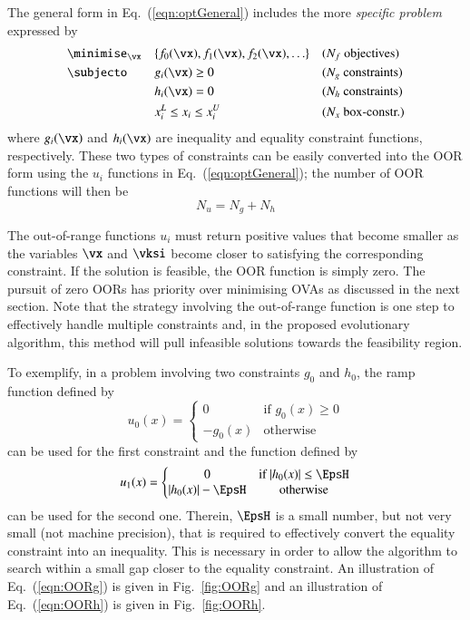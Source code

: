 \documentclass[final,5p,times,twocolumn]{elsarticle}
\newcommand{\figname} {Fig.}
\newcommand{\eqname}  {Eq.}
\begin{document}
The general form in \eqname~(\ref{eqn:optGeneral}) includes the more \emph{specific problem}
expressed by
\begin{equation}
\begin{aligned}
& \minimise_{\vx} && \{f_0(\vx), f_1(\vx), f_2(\vx), \ldots\} && \text{($N_f$ objectives)} \\
& \subjecto       && g_i(\vx) \geq 0                          && \text{($N_g$ constraints)} \\
&                 && h_i(\vx) = 0                             && \text{($N_h$ constraints)} \\
&                 && x_i^L \leq x_i \leq x_i^U                && \text{($N_x$ box-constr.)}
\end{aligned}
\label{eqn:optReal}
\end{equation}
where $g_i(\vx)$ and $h_i(\vx)$ are inequality and equality constraint functions, respectively.
These two types of constraints can be easily converted into the OOR form using the $u_i$ functions
in \eqname~(\ref{eqn:optGeneral}); the number of OOR functions will then be
\begin{equation}
    N_u = N_g + N_h
\end{equation}

The out-of-range functions $u_i$ must return positive values that become smaller as the variables
$\vx$ and $\vksi$ become closer to satisfying the corresponding constraint. If the solution is
feasible, the OOR function is simply zero. The pursuit of zero OORs has priority over minimising
OVAs as discussed in the next section. Note that the strategy involving the out-of-range function is
one step to effectively handle multiple constraints and, in the proposed evolutionary algorithm,
this method will pull infeasible solutions towards the feasibility region.

To exemplify, in a problem involving two constraints $g_0$ and $h_0$, the ramp function defined by
\begin{equation}
    u_0(x) = \left\{\begin{matrix}
        0       & \text{if $g_0(x) \geq 0$} \\
        -g_0(x) & \text{otherwise}
    \end{matrix}\right.
\label{eqn:OORg}
\end{equation}
can be used for the first constraint and the function defined by
\begin{equation}
    u_1(x) = \left\{\begin{matrix}
        0              & \text{if $|h_0(x)| \leq \EpsH$} \\
        |h_0(x)|-\EpsH & \text{otherwise}
    \end{matrix}\right.
\label{eqn:OORh}
\end{equation}
can be used for the second one. Therein, $\EpsH$ is a small number, but not very small (not machine
precision), that is required to effectively convert the equality constraint into an inequality. This
is necessary in order to allow the algorithm to search within a small gap closer to the equality
constraint. An illustration of \eqname~(\ref{eqn:OORg}) is given in \figname~\ref{fig:OORg} and an
illustration of \eqname~(\ref{eqn:OORh}) is given in \figname~\ref{fig:OORh}.
\end{document}
